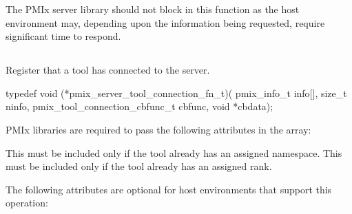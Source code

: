 \adviceimplstart
The \ac{PMIx} server library should not block in this function as the host environment may, depending upon the information being requested, require significant time to respond.
\adviceimplend


\subsection{}

\summary

Register that a tool has connected to the server.

\format

\cspecificstart
\begin{codepar}
typedef void (*pmix_server_tool_connection_fn_t)(
                             pmix_info_t info[], size_t ninfo,
                             pmix_tool_connection_cbfunc_t cbfunc,
                             void *cbdata);
\end{codepar}
\cspecificend

\begin{arglist}
\end{arglist}

\reqattrstart
\ac{PMIx} libraries are required to pass the following attributes in the  array:

This must be included only if the tool already has an assigned namespace.
\pasteAttributeItemEnd{}
This must be included only if the tool already has an assigned rank.
\pasteAttributeItemEnd{}

\reqattrend


\optattrstart
The following attributes are optional for host environments that support this operation:


